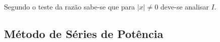 \documentclass{article}
\begin{document}
        \paragraph{}Segundo o teste da razão sabe-se que para $|x|\ne 0$ deve-se analisar $I$.
        \paragraph{}

    \subsection{Método de Séries de Potência}
\end{document}
